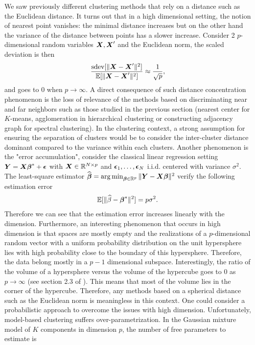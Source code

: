 We saw previously different clustering methods that rely on a distance such as the Euclidean distance. It turns out that in a high dimensional setting, the notion of nearest point vanishes: the minimal distance increases but on the other hand the variance of the distance between points has a slower increase. Consider 2 $p$-dimensional random variables $\boldsymbol X,\boldsymbol X'$ and the Euclidean norm, the scaled deviation is then
\begin{equation}
  \frac{\textnormal{sdev}[\|\boldsymbol X-\boldsymbol X'\|^2]}{{\mathbb E}[\|\boldsymbol X-\boldsymbol X'\|^2]} \approx \frac{1}{\sqrt{p}},
\end{equation}
and goes to $0$ when $p\rightarrow\infty$. A direct consequence of such distance concentration phenomenon is the loss of relevance of the methods based on discriminating near and far neighbors such as those studied in the previous section (nearest center for $K$-means, agglomeration in hierarchical clustering or constructing adjacency graph for spectral clustering). In the clustering context, a strong assumption for ensuring the separation of clusters would be to consider the inter-cluster distance dominant compared to the variance within each clusters. Another phenomenon is the "error accumulation", consider the classical linear regression setting  $\boldsymbol Y=\boldsymbol X\boldsymbol \beta^*+\boldsymbol\epsilon$ with $\boldsymbol X\in {\mathbb R}^{N\times p}$ and $\boldsymbol\epsilon_1,\dots,\boldsymbol\epsilon_N$ i.i.d. centered with variance $\sigma^2$. The least-square estimator $\widehat{\boldsymbol \beta} = \operatorname*{arg\,min}_{\boldsymbol \beta\in{\mathbb R}^{p}}\|\boldsymbol Y-\boldsymbol X\boldsymbol \beta\|^2$ verify the following estimation error
\begin{equation}
  {\mathbb E}[\|\widehat\beta-\boldsymbol \beta^*\|^2]=p\sigma^2.
\end{equation}
Therefore we can see that the estimation error increases linearly with the dimension. Furthermore, an interesting phenomenon that occurs in high dimension is that spaces are mostly empty and the realizations of a $p$-dimensional random vector with a uniform probability distribution on the unit hypersphere lies with high probability close to the boundary of this hypersphere. Therefore, the data belong mostly in a $p-1$ dimensional subspace. Interestingly, the ratio of the volume of a hypersphere versus the volume of the hypercube goes to 0 as $p\rightarrow\infty$ (see section 2.3 of \citep{Zimek2012}). This means that most of the volume lies in the corner of the hypercube. Therefore, any methods based on a spherical distance such as the Euclidean norm is meaningless in this context. One could consider a probabilistic approach to overcome the issues with high dimension. Unfortunately, model-based clustering suffers over-parametrization. In the Gaussian mixture model of $K$ components in dimension $p$, the number of free parameters to estimate is
